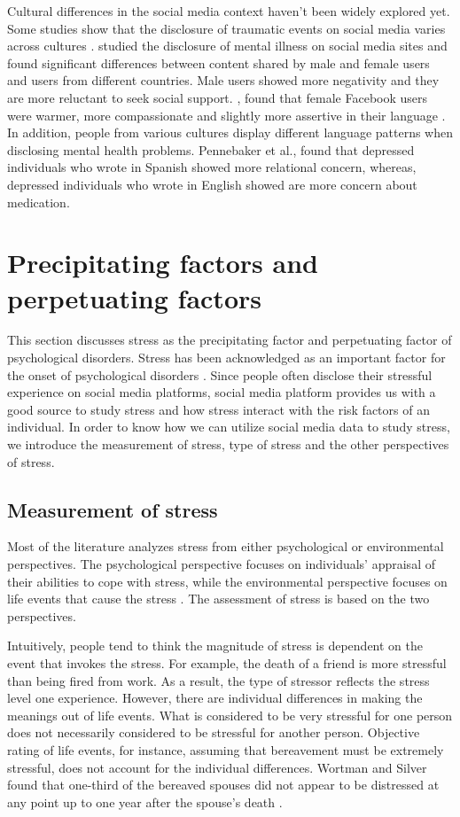 Cultural differences in the social media context haven't been widely explored yet. Some studies show that the disclosure of traumatic events on social media varies across cultures \cite{freitag2011talking,de2016quantifying}. \citet{de_choudhury_gender_2017}studied the disclosure of mental illness on social media sites and found significant differences between content shared by male and female users and users from different countries. Male users showed more negativity and they are more reluctant to seek social support.   \citet{ramirez2008psychology}, found that female Facebook users were warmer, more compassionate and slightly more assertive in their language \cite{park_women_2016}. In addition, people from various cultures display different language patterns when disclosing mental health problems. Pennebaker et al., found that depressed individuals who wrote in Spanish showed more relational concern, whereas, depressed individuals who wrote in English showed are more concern about medication.

\section{Precipitating factors and perpetuating factors}
This section discusses stress as the precipitating factor and perpetuating factor of psychological disorders. Stress has been acknowledged as an important factor for the onset of psychological disorders \cite{langner1963life}. Since people often disclose their stressful experience on social media platforms, social media platform provides us with a good source to study stress and how stress interact with the risk factors of an individual. In order to know how we can utilize social media data to study stress, we introduce the measurement of stress, type of stress and the other perspectives of stress.

\subsection{Measurement of stress}
Most of the literature analyzes stress from either psychological or environmental perspectives. The psychological perspective focuses on individuals' appraisal of their abilities to cope with stress, while the environmental perspective focuses on life events that cause the stress \cite{mcgrath1970social}. The assessment of stress is based on the two perspectives.

Intuitively, people tend to think the magnitude of stress is dependent on the event that invokes the stress. For example, the death of a friend is more stressful than being fired from work. As a result, the type of stressor reflects the stress level one experience. However, there are individual differences in making the meanings out of life events. What is considered to be very stressful for one person does not necessarily considered to be stressful for another person. Objective rating of life events, for instance, assuming that bereavement must be extremely stressful, does not account for the individual differences.  Wortman and Silver found that one-third of the bereaved spouses did not appear to be distressed at any point up to one year after the spouse's death \cite{wortman1989myths}. 


